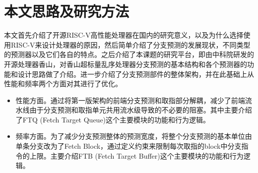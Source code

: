 



\section{本文思路及研究方法}

本文首先介绍了开源RISC-V高性能处理器在国内的研究意义，以及为什么选择使用RISC-V来设计处理器的原因，然后简单介绍了分支预测的发展现状，不同类型的预测器以及它们各自的特点。之后介绍了本课题的研究平台，即由中科院研发的开源处理器香山，对香山超标量乱序处理器分支预测的基本结构和各个预测器的功能和设计思路做了介绍。进一步介绍了分支预测部件的整体架构，并在此基础上从性能和频率两个方面对其进行了优化。

\begin{itemize}
	\item 性能方面。通过将第一版架构的前端分支预测和取指部分解耦，减少了前端流水线由于分支预测和取指单元共用流水级导致的不必要的阻塞。其中主要介绍了FTQ (Fetch Target Queue)这个主要模块的功能和行为逻辑。
	\item 频率方面。为了减少分支预测整体的预测宽度，将整个分支预测的基本单位由单条分支改为了Fetch Block，通过定义约束来限制每次取指的block中分支指令的上限。主要介绍FTB (Fetch Target Buffer)这个主要模块的功能和行为逻辑。
\end{itemize}

